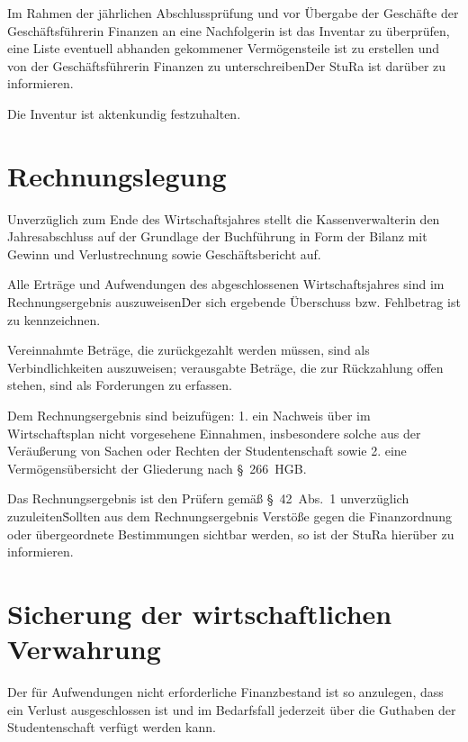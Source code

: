 \begin{multicols}{2}
\Abs \Satz Im Rahmen der jährlichen Abschlussprüfung und vor Übergabe der Geschäfte der Geschäftsführerin Finanzen an eine Nachfolgerin ist das Inventar zu überprüfen, eine Liste eventuell abhanden gekommener Vermögensteile ist zu erstellen und von der Geschäftsführerin Finanzen zu unterschreiben\. Der StuRa ist darüber zu informieren.

\Abs \Satz Die Inventur ist aktenkundig festzuhalten.



\section{Rechnungslegung}

\Abs \Satz Unverzüglich zum Ende des Wirtschaftsjahres stellt die Kassenverwalterin den Jahresabschluss auf der Grundlage der Buchführung in Form der Bilanz mit Gewinn und Verlustrechnung sowie Geschäftsbericht auf.

\Abs \Satz Alle Erträge und Aufwendungen des abgeschlossenen Wirtschaftsjahres sind im Rechnungsergebnis auszuweisen\. Der sich ergebende Überschuss bzw. Fehlbetrag ist zu kennzeichnen.

\Abs \Satz Vereinnahmte Beträge, die zurückgezahlt werden müssen, sind als Verbindlichkeiten auszuweisen; verausgabte Beträge, die zur Rückzahlung offen stehen, sind als Forderungen zu erfassen.

\Abs \Satz Dem Rechnungsergebnis sind beizufügen:
1. ein Nachweis über im Wirtschaftsplan nicht vorgesehene Einnahmen, insbesondere solche aus der Veräußerung von Sachen oder Rechten der Studentenschaft sowie
2. eine Vermögensübersicht der Gliederung nach §~266~HGB.

\Abs \Satz Das Rechnungsergebnis ist den Prüfern gemäß §~42~Abs.~1 unverzüglich zuzuleiten\. Sollten aus dem Rechnungsergebnis Verstöße gegen die Finanzordnung oder übergeordnete Bestimmungen sichtbar werden, so ist der StuRa hierüber zu informieren.



\section{Sicherung der wirtschaftlichen Verwahrung}

\Abs \Satz Der für Aufwendungen nicht erforderliche Finanzbestand ist so anzulegen, dass ein Verlust ausgeschlossen ist und im Bedarfsfall jederzeit über die Guthaben der Studentenschaft verfügt werden kann.


\end{multicols}
